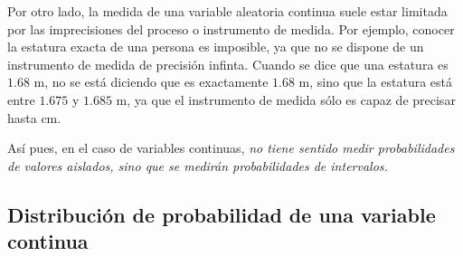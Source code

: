 \begin{frame}
{Por otro lado, la medida de una variable aleatoria continua suele estar limitada por las imprecisiones del proceso o instrumento de medida.
Por ejemplo, conocer la estatura exacta de una persona es imposible, ya que no se dispone de un instrumento de medida de precisión infinta.
Cuando se dice que una estatura es $1.68$ m, no se está diciendo que es exactamente $1.68$ m, sino que la estatura está entre $1.675$ y
$1.685$ m, ya que el instrumento de medida sólo es capaz de precisar hasta cm.

Así pues, en el caso de variables continuas, \alert{\emph{no tiene sentido medir probabilidades de valores aislados, sino que se medirán
probabilidades de intervalos.}}
}
\end{frame}


\subsection{Distribución de probabilidad de una variable continua}


